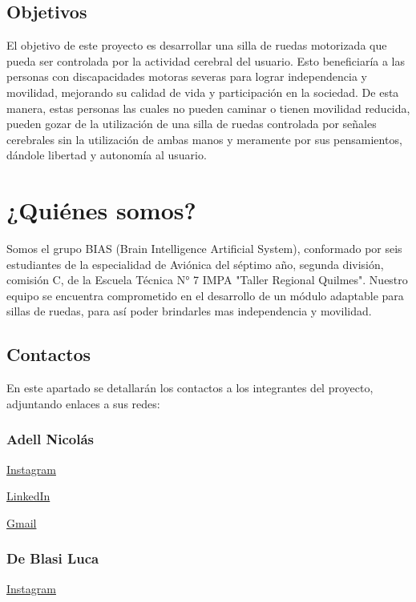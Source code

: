 \documentclass{article}
\begin{document}
\subsection{Objetivos}
El objetivo de este proyecto es desarrollar una silla de ruedas motorizada que pueda ser controlada por la actividad cerebral del usuario. Esto beneficiaría a las personas con discapacidades motoras severas para lograr independencia y movilidad, mejorando su calidad de vida y participación en la sociedad. De esta manera, estas personas las cuales no pueden caminar o tienen movilidad reducida, pueden gozar de la utilización de una silla de ruedas controlada por señales cerebrales sin la utilización de ambas manos y meramente por sus pensamientos, dándole libertad y autonomía al usuario.

\section{¿Quiénes somos?}
Somos el grupo BIAS (Brain Intelligence Artificial System), conformado por seis estudiantes de la especialidad de Aviónica del séptimo año, segunda división, comisión C, de la Escuela Técnica N° 7 IMPA "Taller Regional Quilmes". Nuestro equipo se encuentra comprometido en el desarrollo de un módulo adaptable para sillas de ruedas, para así poder brindarles mas independencia y movilidad.
\subsection{Contactos}

En este apartado se detallarán los contactos a los integrantes del proyecto, adjuntando enlaces a sus redes:

\subsubsection{Adell Nicolás}

    \href{https://instagram.com/nicolas.adell}{Instagram}

    
    \href{http://www.linkedin.com/in/nicolas-adell-354508297}{LinkedIn}

    
    \href{mailto:nicolas.fabian2005@gmail.com}{Gmail}

\subsubsection{De Blasi Luca}

    \href{https://instagram.com/luca.deblasii}{Instagram}
\end{document}
